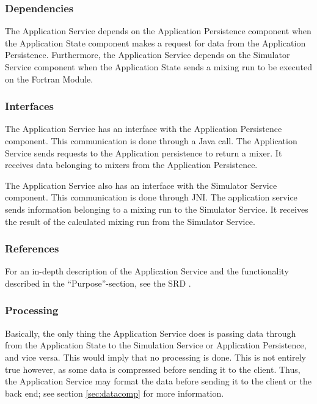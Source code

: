 \subsubsection*{Dependencies}
The Application Service depends on the Application Persistence component when the Application State  component makes a request for data from the Application Persistence. Furthermore, the Application Service depends on the Simulator Service component when the Application State sends a mixing run to be executed on the Fortran Module.

\subsubsection*{Interfaces}
The Application Service has an interface with the Application Persistence component. This communication is done through a Java call. The Application Service sends requests to the Application persistence to return a mixer. It receives data belonging to mixers from the Application Persistence.

The Application Service also has an interface with the Simulator Service component. This communication is done through JNI. The application service sends information belonging to a mixing run to the Simulator Service. It receives the result of the calculated mixing run from the Simulator Service.

\subsubsection*{References}
For an in-depth description of the Application Service and the functionality described in the ``Purpose''-section, see the SRD \cite{srd}.

\subsubsection*{Processing}
Basically, the only thing the Application Service does is passing data through from the Application State to the Simulation Service or Application Persistence, and vice versa. This would imply that no processing is done. This is not entirely true however, as some data is compressed before sending it to the client. Thus, the Application Service may format the data before sending it to the client or the back end; see section \ref{sec:datacomp} for more information.

